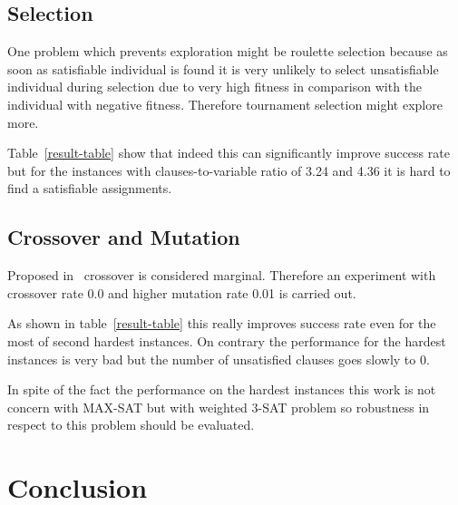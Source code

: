 \documentclass{article}
\begin{document}
\subsection{Selection}

One problem which prevents exploration might be roulette selection
because as soon as satisfiable individual is found
it is very unlikely to select unsatisfiable individual during selection
due to very high fitness in comparison with the individual with negative fitness.
Therefore tournament selection might explore more.

Table~\ref{result-table} show that indeed this can significantly improve
success rate but for the instances with clauses-to-variable ratio of 3.24
and 4.36 it is hard to find a satisfiable assignments.

\subsection{Crossover and Mutation}

Proposed in~\cite{park1995} crossover is considered marginal.
Therefore an experiment with crossover rate 0.0 and higher mutation rate 0.01
is carried out.

As shown in table~\ref{result-table} this really improves success rate even
for the most of second hardest instances.
On contrary the performance for the hardest instances is very bad but the
number of unsatisfied clauses goes slowly to 0.

In spite of the fact the performance on the hardest instances
this work is not concern with MAX-SAT but with weighted 3-SAT problem
so robustness in respect to this problem should be evaluated.

\section{Conclusion}




\end{document}
